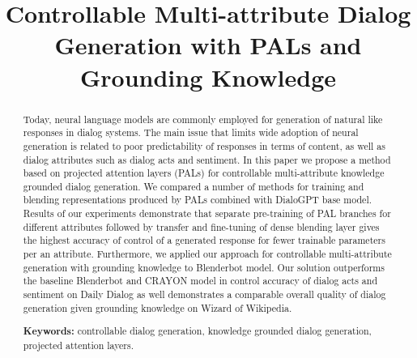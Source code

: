 \documentclass[11pt]{article}
\title{Controllable Multi-attribute Dialog Generation with PALs and Grounding Knowledge}
\date{}
\begin{document}
\maketitle
\begin{abstract}
Today, neural language models are commonly employed for generation of natural like responses in dialog systems. The main issue that limits wide adoption of neural generation is related to poor predictability of responses in terms of content, as well as dialog attributes such as dialog acts and sentiment.
In this paper we propose a method based on projected attention layers (PALs) for controllable multi-attribute knowledge grounded dialog generation. We compared a number of methods for training and blending representations produced by PALs combined with DialoGPT base model. Results of our experiments demonstrate that separate pre-training of PAL branches for different attributes followed by transfer and fine-tuning of dense blending layer gives the highest accuracy of control of a generated response for fewer trainable parameters per an attribute. Furthermore, we applied our approach for controllable multi-attribute generation with grounding knowledge to Blenderbot model. Our solution outperforms the baseline Blenderbot and CRAYON model in control accuracy of dialog acts and sentiment on Daily Dialog as well demonstrates a comparable overall quality  of dialog generation given grounding knowledge on Wizard of Wikipedia.
  
\textbf{Keywords:} controllable dialog generation, knowledge grounded dialog generation, projected attention layers.
\end{abstract}

\begin{center}

\end{center}
\end{document}
